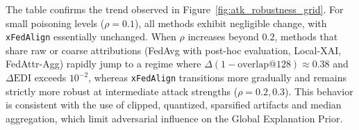 \documentclass{article}
\theoremstyle{plain}
\theoremstyle{definition}
\theoremstyle{remark}
\begin{document}
The table confirms the trend observed in Figure~\ref{fig:atk_robustness_grid}. For small poisoning levels ($\rho=0.1$), all methods exhibit negligible change, with \texttt{xFedAlign} essentially unchanged. When $\rho$ increases beyond $0.2$, methods that share raw or coarse attributions (FedAvg with post-hoc evaluation, Local-XAI, FedAttr-Agg) rapidly jump to a regime where $\Delta(1-\text{overlap@}128)\approx 0.38$ and $\Delta\mathrm{EDI}$ exceeds $10^{-2}$, whereas \texttt{xFedAlign} transitions more gradually and remains strictly more robust at intermediate attack strengths ($\rho=0.2,0.3$). This behavior is consistent with the use of clipped, quantized, sparsified artifacts and median aggregation, which limit adversarial influence on the Global Explanation Prior.
\medskip
\end{document}
